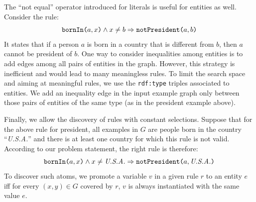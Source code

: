 \noindent {}
The ``not equal'' operator introduced for literals is useful for entities as well. 
Consider the rule:
$$ \texttt{bornIn(}a,x\texttt{)} \wedge x \neq b \Rightarrow \texttt{notPresident(}a,b\texttt{)} $$
It states that if a person $a$ is born in a country that is different from $b$, then $a$ cannot be president of $b$.
One way to consider inequalities among entities is to add edges among all pairs of entities in the graph. However, this strategy is inefficient and would lead to many meaningless rules. To limit the search space and aiming at meaningful rules, we use the \texttt{rdf:type} triples associated to entities. We add an inequality edge in the input example graph only between those pairs of entities of the same type (as in the president example above). %

\noindent {}
Finally, we allow the discovery of rules with constant selections. %
Suppose that for the above rule for president, all examples in $G$ are people born in the country ``\textit{U.S.A.}'' and there is at least one country for which this rule is not valid. According to our problem statement, the right rule is therefore:
%
$$ \texttt{bornIn(}a,x\texttt{)} \wedge x \neq \emph{U.S.A.} \Rightarrow \texttt{notPresident(}a,\emph{U.S.A.}\texttt{)} $$
%
To discover such atoms, %
we promote a variable $v$ in a given rule $r$ to an entity $e$ iff for every $(x,y) \in G$ covered by $r$, $v$ is always instantiated with the same value $e$. 

\vspace{-1ex}
